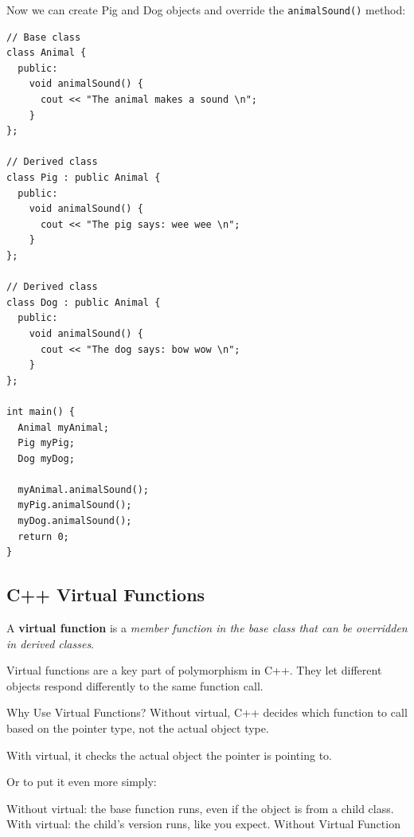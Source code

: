 \documentclass[../basic_programs.tex]{subfiles}
\begin{document}
  Now we can create Pig and Dog objects and override the \lstinline|animalSound()| method:

  \begin{lstlisting}[caption={caption},label=DescriptiveLabel]
// Base class
class Animal {
  public:
    void animalSound() {
      cout << "The animal makes a sound \n";
    }
};

// Derived class
class Pig : public Animal {
  public:
    void animalSound() {
      cout << "The pig says: wee wee \n";
    }
};

// Derived class
class Dog : public Animal {
  public:
    void animalSound() {
      cout << "The dog says: bow wow \n";
    }
};

int main() {
  Animal myAnimal;
  Pig myPig;
  Dog myDog;

  myAnimal.animalSound();
  myPig.animalSound();
  myDog.animalSound();
  return 0;
}
  \end{lstlisting}

  \subsection{C++ Virtual Functions}

  \begin{mydef}
    A \textbf{virtual function} is a \textit{member function in the base class that can be overridden in derived classes}.
  \end{mydef}

  Virtual functions are a key part of polymorphism in C++. They let different objects respond differently to the same function call.

  Why Use Virtual Functions?
  Without virtual, C++ decides which function to call based on the pointer type, not the actual object type.

  With virtual, it checks the actual object the pointer is pointing to.

  Or to put it even more simply:

  Without virtual: the base function runs, even if the object is from a child class.
  With virtual: the child's version runs, like you expect.
  Without Virtual Function
\end{document}
